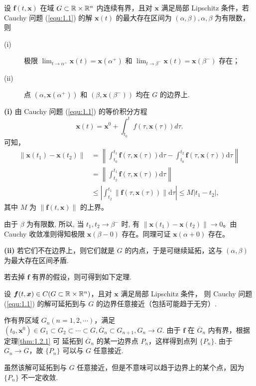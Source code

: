 \begin{thm}\label{thm:1.2.1}
设 $\bm{f}(t,\bm{x})$ 在域 $G\subset \mathbb{R}\times\mathbb{R}^n$ 内连续有界，且对 $\bm{x}$
满足局部 Lipschitz 条件，若 Cauchy 问题 (\ref{equ:1.1}) 的解 $\bm{x}(t)$
的最大存在区间为 $(\alpha,\beta), \alpha,\beta$ 为有限数，则
\begin{description}
    \item[(i)] 极限 $\lim_{t\to\alpha^+}\bm{x}(t)=\bm{x}(\alpha^+)$ 和 $\lim_{t\to\beta^-}\bm{x}(t)=\bm{x}(\beta^-)$ 存在；
    \item[(ii)] 点 $(\alpha,\bm{x}(\alpha^+))$ 和 $(\beta,\bm{x}(\beta^-))$ 均在 $G$ 的边界上.
\end{description}
\end{thm}
\begin{pf1}
\textbf{(i)} 由 Cauchy 问题 (\ref{equ:1.1}) 的等价积分方程
\[
\bm{x}(t)=\bm{x}^0+\int_{t_0}^tf(\tau,\bm{x}(\tau))d\tau.
\]
可知，
\[
\begin{aligned}
\|\boldsymbol{x}(t_1)-\boldsymbol{x}(t_2)\|
&= \left\| \int_{t_0}^{t_1} \boldsymbol{f}(\tau,\boldsymbol{x}(\tau))\mathrm{d}\tau
- \int_{t_0}^{t_2} \boldsymbol{f}(\tau,\boldsymbol{x}(\tau))\mathrm{d}\tau \right\| \\
&= \left\| \int_{t_2}^{t_1} \boldsymbol{f}(\tau,\boldsymbol{x}(\tau))\mathrm{d}\tau \right\| \\
&\leqslant \left| \int_{t_2}^{t_1} \|\boldsymbol{f}(\tau,\boldsymbol{x}(\tau))\| \mathrm{d}\tau \right|
\leq M|t_1-t_2|,
\end{aligned}
\]
其中 $M$ 为 $\|\boldsymbol{f}(t,\boldsymbol{x})\|$ 的上界。

由于 $\beta$ 为有限数, 所以, 当 $t_1,t_2 \to \beta^-$ 时, 有 $\|\boldsymbol{x}(t_1)-\boldsymbol{x}(t_2)\| \to 0$。由 Cauchy 收敛准则得知极限 $\boldsymbol{x}(\beta-0)$ 存在。同理可证 $\boldsymbol{x}(\alpha+0)$ 存在。

\textbf{(ii)} 若它们不在边界上，则它们就是 $G$ 的内点，于是可继续延拓，这与 $(\alpha,\beta)$ 为最大存在区间矛盾.
\end{pf1}

若去掉 $\bm{f}$ 有界的假设，则可得到如下定理.
\begin{thm}\label{thm:1.2.2}
设 $\bm{f}(t,\bm{x})\in C(G\subset\mathbb{R}\times\mathbb{R}^n)$，且对 $\bm{x}$ 满足局部 Lipschitz 条件，
则 Cauchy 问题 (\ref{equ:1.1}) 的解可延拓到与 $G$ 的边界任意接近（包括可能趋于无穷）. 
\end{thm}
\begin{pf1}
作有界区域 $G_n(n=1,2,\cdots)$，满足 $(t_0,\bm{x}^0)\in G_1\subset G_2\subset \cdots\subset G, \overline{G}_n\subset G_{n+1}, G_n\to G$.
由于 $\bm{f}$ 在 $\overline{G}_n$ 内有界，根据定理\ref{thm:1.2.1} 可
延拓到 $\overline{G}_n$ 的某一边界点 $P_n$，这样得到点列 $\{P_n\}$.
由于 $G_n\to G$，故 $\{P_n\}$ 可以与 $G$ 任意接近.
\end{pf1}
\begin{rmk}
虽然该解可延拓到与 $G$ 任意接近，但是不意味可以趋于边界上的某个点，因为 $\{P_n\}$ 不一定收敛.
\end{rmk}

